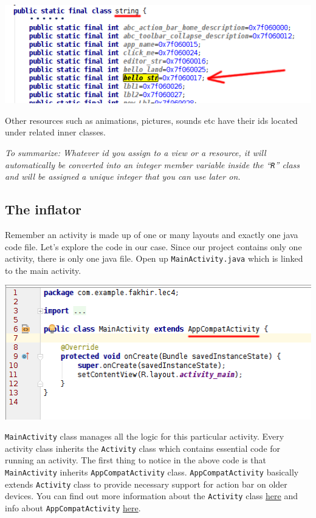 \begin{center}
	\includegraphics[scale=0.4]{chapters/ch04/images/33}
\end{center}

Other resources such as animations, pictures, sounds etc have their ids located under related inner classes.

\vskip 3mm
\textit{To summarize: Whatever id you assign to a view or a resource, it will automatically be converted into an integer member variable inside the ``\texttt{R}'' class and will be assigned a unique integer that you can use later on.}

\subsection{The inflator}
Remember an activity is made up of one or many layouts and exactly one java code file. Let's explore the code in our case. Since our project contains only one activity, there is only one java file. Open up \texttt{MainActivity.java} which is linked to the main activity. 

\begin{center}
	\includegraphics[scale=0.4]{chapters/ch04/images/34}
\end{center}

\texttt{MainActivity} class manages all the logic for this particular activity. Every activity class inherits the \texttt{Activity} class which contains essential code for running an activity. The first thing to notice in the above code is that \texttt{MainActivity} inherits \texttt{AppCompatActivity} class. \texttt{AppCompatActivity} basically extends \texttt{Activity} class to provide necessary support for action bar on older devices. You can find out more information about the \texttt{Activity} class \href{https://developer.android.com/reference/android/app/Activity.html}{here} and info about \texttt{AppCompatActivity} \href{https://developer.android.com/reference/android/support/v7/app/AppCompatActivity.html}{here}. \\

